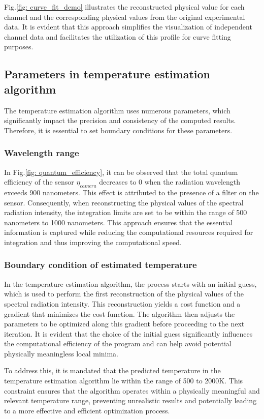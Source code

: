 Fig.\ref{fig: curve_fit_demo} illustrates the reconstructed physical 
value for each channel and the corresponding physical values from the 
original experimental data. It is evident that this approach simplifies 
the visualization of independent channel data and facilitates the 
utilization of this profile for curve fitting purposes.


\subsection{Parameters in temperature estimation algorithm}
The temperature estimation algorithm uses numerous parameters, 
which significantly impact the precision and consistency of the 
computed results. Therefore, it is essential to set boundary conditions 
for these parameters.


\subsubsection{Wavelength range}
In Fig.\ref{fig: quantum_efficiency}, it can be observed that the 
total quantum efficiency of the sensor $\eta_{camera}$ decreases to 
0 when the radiation wavelength exceeds 900 nanometers. This effect is 
attributed to the presence of a filter on the sensor. Consequently, 
when reconstructing the physical values of the spectral radiation 
intensity, the integration limits are set to be within the 
range of 500 nanometers to 1000 nanometers. This approach ensures 
that the essential information is captured while reducing the 
computational resources required for integration and thus improving the 
computational speed.


\subsubsection{Boundary condition of estimated temperature}
In the temperature estimation algorithm, the process starts with an 
initial guess, which is used to perform the first reconstruction of 
the physical values of the spectral radiation intensity. This 
reconstruction yields a cost function and a gradient that 
minimizes the cost function. The algorithm then adjusts the parameters 
to be optimized along this gradient before proceeding to the next 
iteration. It is evident that the choice of the initial guess 
significantly influences the computational efficiency of the 
program and can help avoid potential physically meaningless 
local minima.

To address this, it is mandated that the predicted temperature in the 
temperature estimation algorithm lie within the range of 500 to 2000K. 
This constraint ensures that the algorithm operates within a 
physically meaningful and relevant temperature range, preventing 
unrealistic results and potentially leading to a more effective and 
efficient optimization process.

